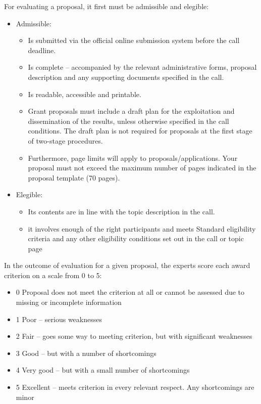 \documentclass{article}
\begin{document}
For evaluating a proposal, it first must be admissible and elegible:
\begin{itemize}
	\item Admissible:
	\begin{itemize}
		\item Is submitted via the official online submission system before the call deadline.
		\item Is complete – accompanied by the relevant administrative forms, proposal description and any supporting documents specified in the call.
		\item Is readable, accessible and printable.
		\item Grant proposals must include a draft plan for the exploitation and dissemination of the results, unless otherwise specified in the call conditions. The draft plan is not required for proposals at the first stage of two-stage procedures.
		\item Furthermore, page limits will apply to proposals/applications. Your proposal must not exceed the maximum number of pages indicated in the proposal template (70 pages). 
	\end{itemize}
	
	\item Elegible:
	\begin{itemize}
		\item Its contents are in line with the topic description in the call.
		\item it involves enough of the right participants and meets Standard eligibility criteria and any other eligibility conditions set out in the call or topic page
	\end{itemize}
\end{itemize}

In the outcome of evaluation for a given proposal, the experts score each award criterion on a scale from 0 to 5:
\begin{itemize}
	\item 0 Proposal does not meet the criterion at all or cannot be assessed due to missing or incomplete information
    \item 1 Poor – serious weaknesses
    \item 2 Fair – goes some way to meeting criterion, but with significant weaknesses
    \item 3 Good – but with a number of shortcomings
    \item 4 Very good – but with a small number of shortcomings
    \item 5 Excellent – meets criterion in every relevant respect. Any shortcomings are minor
\end{itemize}
\end{document}
